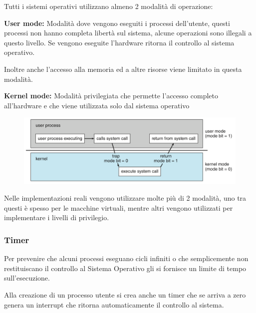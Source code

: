 Tutti i sistemi operativi utilizzano almeno 2 modalità di operazione:
\spacer
\begin{sitemize}
    \item \textbf{User mode:} Modalità dove vengono eseguiti i processi dell'utente, questi processi non hanno completa libertà sul sistema, alcune operazioni sono illegali a questo livello. Se vengono eseguite l'hardware ritorna il controllo al sistema operativo.

    Inoltre anche l'accesso alla memoria ed a altre risorse viene limitato in questa modalità.

    \item \textbf{Kernel mode:} Modalità privilegiata che permette l'accesso completo all'hardware e che viene utilizzata solo dal sistema operativo
\end{sitemize}

\begin{figure}[H]
    \centering
    \includegraphics[width=0.65\linewidth]{assets/multimode.png}
\end{figure}

Nelle implementazioni reali vengono utilizzare molte più di 2 modalità, uno tra questi è spesso per le macchine virtuali, mentre altri vengono utilizzati per implementare i livelli di privilegio.

\subsubsection{Timer}
Per prevenire che alcuni processi eseguano cicli infiniti o che semplicemente non restituiscano il controllo al Sistema Operativo gli si fornisce un limite di tempo sull'esecuzione.

Alla creazione di un processo utente si crea anche un timer che se arriva a zero genera un interrupt che ritorna automaticamente il controllo al sistema.

